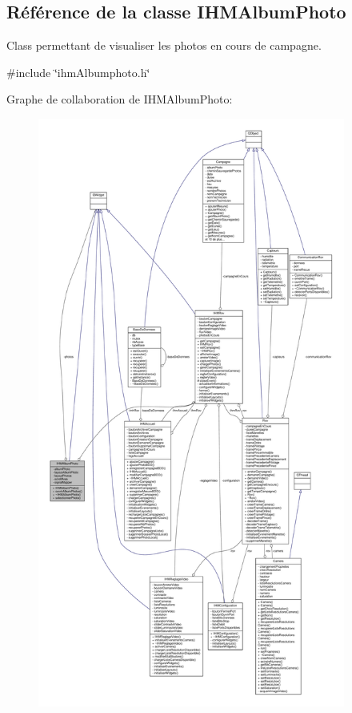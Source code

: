 \hypertarget{class_i_h_m_album_photo}{}\subsection{Référence de la classe I\+H\+M\+Album\+Photo}
\label{class_i_h_m_album_photo}


Class permettant de visualiser les photos en cours de campagne.  




{\ttfamily \#include \char`\"{}ihm\+Albumphoto.\+h\char`\"{}}



Graphe de collaboration de I\+H\+M\+Album\+Photo\+:
\nopagebreak
\begin{figure}[H]
\begin{center}
\leavevmode
\includegraphics[height=550pt]{class_i_h_m_album_photo__coll__graph}
\end{center}
\end{figure}

